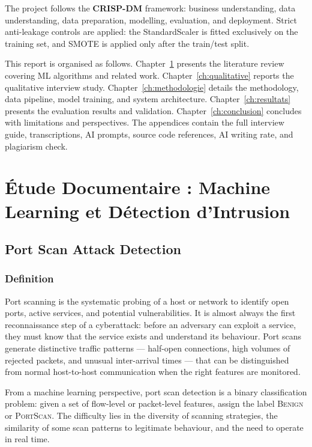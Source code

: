 \documentclass[12pt,a4paper]{report}
\begin{document}
The project follows the \textbf{CRISP-DM} framework: business understanding, data understanding, data preparation, modelling, evaluation, and deployment. Strict anti-leakage controls are applied: the StandardScaler is fitted exclusively on the training set, and SMOTE is applied only after the train/test split.

This report is organised as follows. Chapter~\ref{ch:documentaire} presents the literature review covering ML algorithms and related work. Chapter~\ref{ch:qualitative} reports the qualitative interview study. Chapter~\ref{ch:methodologie} details the methodology, data pipeline, model training, and system architecture. Chapter~\ref{ch:resultats} presents the evaluation results and validation. Chapter~\ref{ch:conclusion} concludes with limitations and perspectives. The appendices contain the full interview guide, transcriptions, AI prompts, source code references, AI writing rate, and plagiarism check.

\chapter{\'{E}tude Documentaire : Machine Learning et D\'{e}tection d'Intrusion}\label{ch:documentaire}

\section{Port Scan Attack Detection}

\subsection{Definition}

Port scanning is the systematic probing of a host or network to identify open ports, active services, and potential vulnerabilities. It is almost always the first reconnaissance step of a cyberattack: before an adversary can exploit a service, they must know that the service exists and understand its behaviour. Port scans generate distinctive traffic patterns --- half-open connections, high volumes of rejected packets, and unusual inter-arrival times --- that can be distinguished from normal host-to-host communication when the right features are monitored.

From a machine learning perspective, port scan detection is a binary classification problem: given a set of flow-level or packet-level features, assign the label \textsc{Benign} or \textsc{PortScan}. The difficulty lies in the diversity of scanning strategies, the similarity of some scan patterns to legitimate behaviour, and the need to operate in real time.
\end{document}
